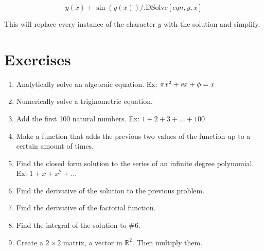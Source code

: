 \documentclass[11pt,a4paper,twoside]{article}
\begin{document}
				\[ y(x) + \sin(y(x)) /. \text{DSolve}[eqn,y,x] \]
				
				This will replace every instance of the character $y$ with the solution and simplify.
				
		\section{Exercises}
		
			\begin{enumerate}
			
%				
					
				\item %
				
					Analytically solve an algebraic equation.  Ex: $ \pi x^2 + \emph{e} x + \phi = x $
					
				\item %
				
					Numerically solve a triginometric equation.
					
				\item %
				
					Add the first 100 natural numbers. Ex: $1+2+3+ \dots +100$
					
				\item %
				
					Make a function that adds the previous two values of the function up to a certain amount of times.
					
				\item %
				
					Find the closed form solution to the series of an infinite degree polynomial. Ex: $ 1 + x + x^2 + \dots $
					
				\item %
				
					Find the derivative of the solution to the previous problem.
					
				\item %
				
					Find the derivative of the factorial function.
					
				\item %
				
					Find the integral of the solution to \#6.
					
				\item %
				
					Create a $2\times 2$ matrix, a vector in $\mathbb{R}^2$.  Then multiply them.
					

\end{enumerate}
\end{document}
